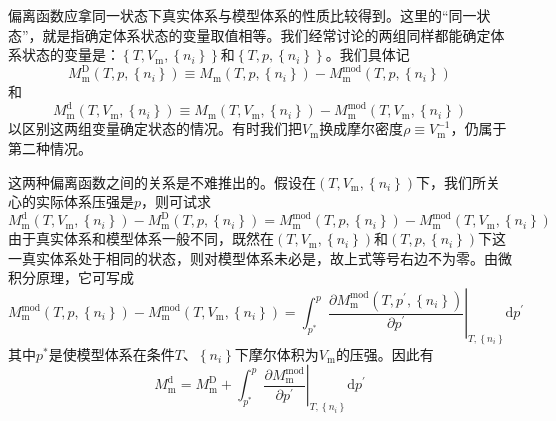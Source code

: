 \documentclass[main.tex]{subfiles}
\begin{document}
偏离函数应拿同一状态下真实体系与模型体系的性质比较得到。这里的“同一状态”，就是指确定体系状态的变量取值相等。我们经常讨论的两组同样都能确定体系状态的变量是：$\left\{T,V_\text{m},\left\{n_i\right\}\right\}$和$\left\{T,p,\left\{n_i\right\}\right\}$。我们具体记
\begin{equation}\label{eq:def_deviation_function_D}
    M^\text{D}_\text{m}\left(T,p,\left\{n_i\right\}\right)\equiv M_\text{m}\left(T,p,\left\{n_i\right\}\right)-M^\text{mod}_\text{m}\left(T,p,\left\{n_i\right\}\right)
\end{equation}
和
\begin{equation}\label{eq:def_deviation_function_d}
    M^\text{d}_\text{m}\left(T,V_\text{m},\left\{n_i\right\}\right)\equiv M_\text{m}\left(T,V_\text{m},\left\{n_i\right\}\right)-M^\text{mod}_\text{m}\left(T,V_\text{m},\left\{n_i\right\}\right)
\end{equation}
以区别这两组变量确定状态的情况。有时我们把$V_\text{m}$换成摩尔密度$\rho\equiv V^{-1}_\text{m}$，仍属于第二种情况。

这两种偏离函数之间的关系是不难推出的。假设在$\left(T,V_\text{m},\left\{n_i\right\}\right)$下，我们所关心的实际体系压强是$p$，则可试求
\[M^\text{d}_\text{m}\left(T,V_\text{m},\left\{n_i\right\}\right)-M^\text{D}_\text{m}\left(T,p,\left\{n_i\right\}\right)=M^\text{mod}_\text{m}\left(T,p,\left\{n_i\right\}\right)-M^\text{mod}_\text{m}\left(T,V_\text{m},\left\{n_i\right\}\right)\]
由于真实体系和模型体系一般不同，既然在$\left(T,V_\text{m},\left\{n_i\right\}\right)$和$\left(T,p,\left\{n_i\right\}\right)$下这一真实体系处于相同的状态，则对模型体系未必是，故上式等号右边不为零。由微积分原理，它可写成
\[M^\text{mod}_\text{m}\left(T,p,\left\{n_i\right\}\right)-M^\text{mod}_\text{m}\left(T,V_\text{m},\left\{n_i\right\}\right)=\int_{p^*}^p\left.\frac{\partial M^\text{mod}_\text{m}\left(T,p^\prime,\left\{n_i\right\}\right)}{\partial p^\prime}\right|_{T,\left\{n_i\right\}}\mathrm{d}p^\prime\]
其中$p^*$是使模型体系在条件$T$、$\left\{n_i\right\}$下摩尔体积为$V_\text{m}$的压强。因此有
\begin{equation}\label{eq:rel_M~D_M~d}
    M^\text{d}_\text{m}=M^\text{D}_\text{m}+\int_{p^*}^p\left.\frac{\partial M^\text{mod}_\text{m}}{\partial p^\prime}\right|_{T,\left\{n_i\right\}}\mathrm{d}p^\prime
\end{equation}
\end{document}
